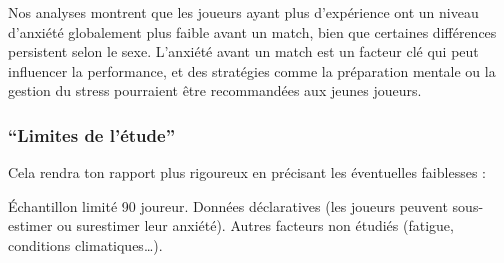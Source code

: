 \documentclass[
]{article}
\begin{document}
Nos analyses montrent que les joueurs ayant plus d'expérience ont un
niveau d'anxiété globalement plus faible avant un match, bien que
certaines différences persistent selon le sexe. L'anxiété avant un match
est un facteur clé qui peut influencer la performance, et des stratégies
comme la préparation mentale ou la gestion du stress pourraient être
recommandées aux jeunes joueurs.

\subsubsection{``Limites de l'étude''}\label{limites-de-luxe9tude}

Cela rendra ton rapport plus rigoureux en précisant les éventuelles
faiblesses :

Échantillon limité 90 joureur. Données déclaratives (les joueurs peuvent
sous-estimer ou surestimer leur anxiété). Autres facteurs non étudiés
(fatigue, conditions climatiques\ldots).
\end{document}
